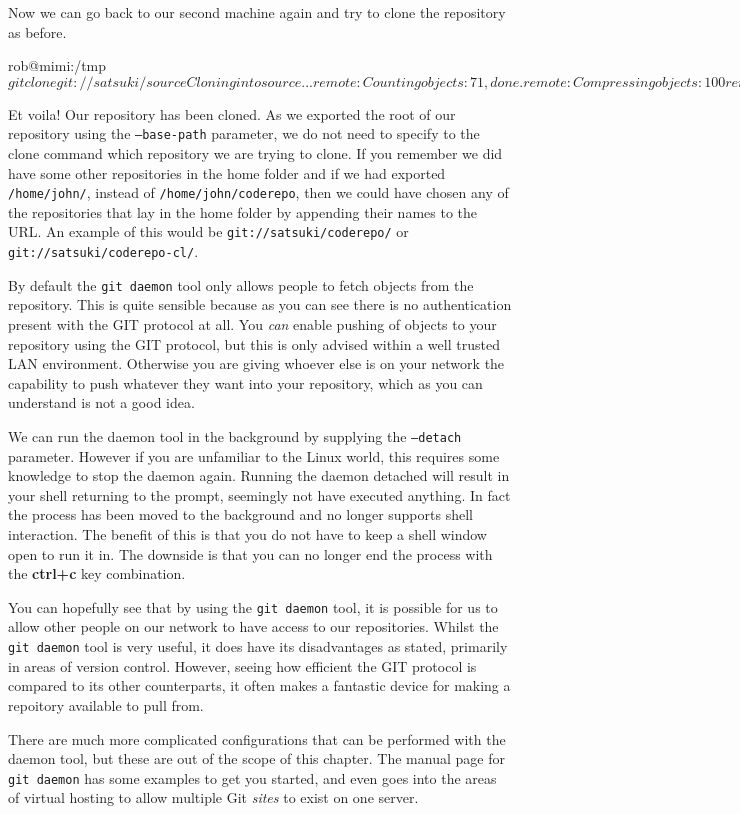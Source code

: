 Now we can go back to our second machine again and try to clone the repository as before.

\begin{code}
rob@mimi:/tmp$ git clone git://satsuki/ source
Cloning into source...
remote: Counting objects: 71, done.
remote: Compressing objects: 100%
remote: Total 71 (delta 16), reused 0 (delta 0)
Receiving objects: 100%
Resolving deltas: 100%
rob@mimi:/tmp$
\end{code}

Et voila! Our repository has been cloned.
As we exported the root of our repository using the \texttt{--base-path} parameter, we do not need to specify to the clone command which repository we are trying to clone.
If you remember we did have some other repositories in the home folder and if we had exported \texttt{/home/john/}, instead of \texttt{/home/john/coderepo},
then we could have chosen any of the repositories that lay in the home folder by appending their names to the URL.
An example of this would be \texttt{git://satsuki/coderepo/} or \texttt{git://satsuki/coderepo-cl/}.

By default the \texttt{git daemon} tool only allows people to fetch objects from the repository.
This is quite sensible because as you can see there is no authentication present with the GIT protocol at all.
You \emph{can} enable pushing of objects to your repository using the GIT protocol, but this is only advised within a well trusted LAN environment.
Otherwise you are giving whoever else is on your network the capability to push whatever they want into your repository, which as you can understand is not a good idea.

We can run the daemon tool in the background by supplying the \texttt{--detach} parameter.
However if you are unfamiliar to the Linux world, this requires some knowledge to stop the daemon again.
Running the daemon detached will result in your shell returning to the prompt, seemingly not have executed anything.
In fact the process has been moved to the background and no longer supports shell interaction.
The benefit of this is that you do not have to keep a shell window open to run it in.
The downside is that you can no longer end the process with the \textbf{ctrl+c} key combination.

You can hopefully see that by using the \texttt{git daemon} tool, it is possible for us to allow other people on our network to have access to our repositories.
Whilst the \texttt{git daemon} tool is very useful, it does have its disadvantages as stated, primarily in areas of version control.
However, seeing how efficient the GIT protocol is compared to its other counterparts, it often makes a fantastic device for making a repoitory available to pull from.

There are much more complicated configurations that can be performed with the daemon tool, but these are out of the scope of this chapter.
The manual page for \texttt{git daemon} has some examples to get you started,
and even goes into the areas of virtual hosting to allow multiple Git \emph{sites} to exist on one server.
